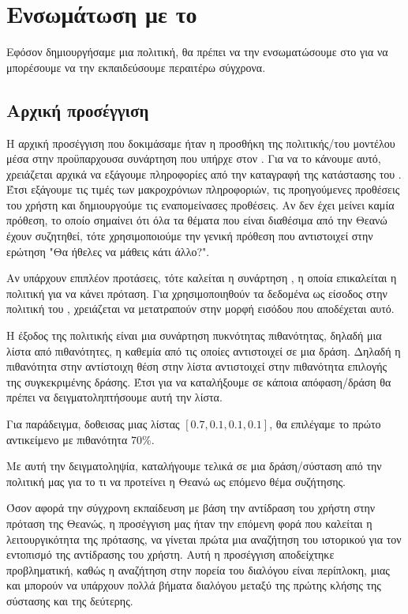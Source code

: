 
\section{Ενσωμάτωση με το }

Εφόσον δημιουργήσαμε μια πολιτική, θα πρέπει να την ενσωματώσουμε στο  για να μπορέσουμε να την εκπαιδεύσουμε περαιτέρω σύγχρονα.

\subsection{Αρχική προσέγγιση}

Η αρχική προσέγγιση που δοκιμάσαμε ήταν η προσθήκη της πολιτικής/του μοντέλου μέσα στην προϋπαρχουσα συνάρτηση που υπήρχε στον . Για να το κάνουμε αυτό, χρειάζεται αρχικά να εξάγουμε πληροφορίες από την καταγραφή της κατάστασης του . Έτσι εξάγουμε τις τιμές των μακροχρόνιων πληροφοριών, τις προηγούμενες προθέσεις του χρήστη και δημιουργούμε τις εναπομείνασες προθέσεις. Αν δεν έχει μείνει καμία πρόθεση, το οποίο σημαίνει ότι όλα τα θέματα που είναι διαθέσιμα από την Θεανώ έχουν συζητηθεί, τότε χρησιμοποιούμε την γενική πρόθεση  που αντιστοιχεί στην ερώτηση "Θα ήθελες να μάθεις κάτι άλλο?".

Αν υπάρχουν επιπλέον προτάσεις, τότε καλείται η συνάρτηση , η οποία επικαλείται η πολιτική για να κάνει πρόταση. Για χρησιμοποιηθούν τα δεδομένα ως είσοδος στην πολιτική του , χρειάζεται να μετατραπούν στην μορφή εισόδου που αποδέχεται αυτό.

Η έξοδος της πολιτικής είναι μια συνάρτηση πυκνότητας πιθανότητας, δηλαδή μια λίστα από πιθανότητες, η καθεμία από τις οποίες αντιστοιχεί σε μια δράση. Δηλαδή η πιθανότητα στην αντίστοιχη θέση στην λίστα αντιστοιχεί στην πιθανότητα επιλογής της συγκεκριμένης δράσης. Έτσι για να καταλήξουμε σε κάποια απόφαση/δράση θα πρέπει να δειγματοληπτήσουμε αυτή την λίστα.

Για παράδειγμα, δοθεισας μιας λίστας $[0.7, 0.1, 0.1, 0.1]$, θα επιλέγαμε το πρώτο αντικείμενο με πιθανότητα $70\%$.

Με αυτή την δειγματοληψία, καταλήγουμε τελικά σε μια δράση/σύσταση από την πολιτική μας για το τι να προτείνει η Θεανώ ως επόμενο θέμα συζήτησης.

Όσον αφορά την σύγχρονη εκπαίδευση με βάση την αντίδραση του χρήστη στην πρόταση της Θεανώς, η προσέγγιση μας ήταν την επόμενη φορά που καλείται η λειτουργικότητα της πρότασης, να γίνεται πρώτα μια αναζήτηση του ιστορικού για τον εντοπισμό της αντίδρασης του χρήστη. Αυτή η προσέγγιση αποδείχτηκε προβληματική, καθώς η αναζήτηση στην πορεία του διαλόγου είναι περίπλοκη, μιας και μπορούν να υπάρχουν πολλά βήματα διαλόγου μεταξύ της πρώτης κλήσης της σύστασης και της δεύτερης.

